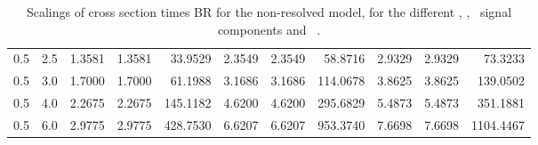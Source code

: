 \begin{table}[h!]
\begin{tabular}{ll rrr rrr rrr}
   0.5 & 2.5    & 1.3581 & 1.3581 & 33.9529  & 2.3549 & 2.3549 & 58.8716   & 2.9329 & 2.9329 & 73.3233 \\
   0.5 & 3.0    & 1.7000 & 1.7000 & 61.1988  & 3.1686 & 3.1686 & 114.0678  & 3.8625 & 3.8625 & 139.0502 \\
   0.5 & 4.0    & 2.2675 & 2.2675 & 145.1182 & 4.6200 & 4.6200 & 295.6829  & 5.4873 & 5.4873 & 351.1881 \\
   0.5 & 6.0    & 2.9775 & 2.9775 & 428.7530 & 6.6207 & 6.6207 & 953.3740  & 7.6698 & 7.6698 & 1104.4467 \\\hline
  \end{tabular}
  \caption{Scalings of cross section times BR for the non-resolved model, for the different \ttH, \tHq, \tHW\ signal components and \ .}\label{tab:xsbrscalingK6_0p5}
\end{table}

